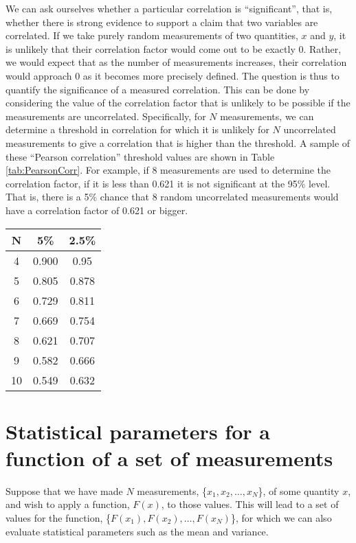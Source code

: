 We can ask ourselves whether a particular correlation is ``significant'', that is, whether there is strong evidence to support a claim that two variables are correlated. If we take purely random measurements of two quantities, $x$ and $y$, it is unlikely that their correlation factor would come out to be exactly 0. Rather, we would expect that as the number of measurements increases, their correlation would approach 0 as it becomes more precisely defined.  The question is thus to quantify the significance of a measured correlation. This can be done by considering the value of the correlation factor that is unlikely to be possible if the measurements are uncorrelated. Specifically, for $N$ measurements, we can determine a threshold in correlation for which it is unlikely for $N$ uncorrelated measurements to give a correlation that is higher than the threshold. A sample of these ``Pearson correlation'' threshold values are shown in Table \ref{tab:PearsonCorr}. For example, if 8 measurements are used to determine the correlation factor, if it is less than 0.621 it is not significant at the 95\% level. That is, there is a 5\% chance that 8 random uncorrelated measurements would have a correlation factor of 0.621 or bigger.

\begin{center}
\begin{tabular}{|c|c|c|}
\hline
\textbf{N} & \textbf{5\%} &\textbf{2.5\%}\\
\hline
4 & 0.900 &0.95 \\
5 & 0.805 &0.878 \\
6 & 0.729 &0.811 \\
7 & 0.669 &0.754 \\
8 & 0.621 &0.707 \\
9 & 0.582 &0.666 \\
10 & 0.549 &0.632 \\
\hline
\end{tabular}
\end{center}

\section{Statistical parameters for a function of a set of measurements}
Suppose that we have made $N$ measurements, \{$x_1, x_2, \dots, x_N$\}, of some quantity $x$, and wish to apply a function, $F(x)$, to those values. This will lead to a set of values for the function, \{$F(x_1), F(x_2), \dots, F(x_N)$\}, for which we can also evaluate statistical parameters such as the mean and variance. 

